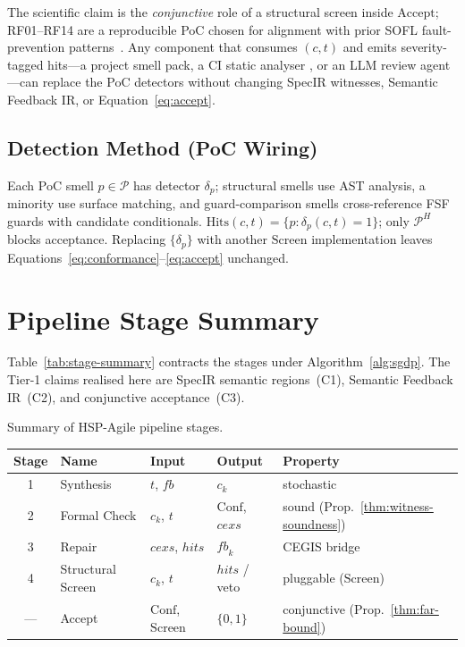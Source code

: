 The scientific claim is the \emph{conjunctive} role of a structural screen
inside $\mathrm{Accept}$; RF01--RF14 are a reproducible PoC chosen for
alignment with prior SOFL fault-prevention patterns~\citep{li2023iet_faultprevention}.
Any component that consumes $(c,t)$ and emits severity-tagged hits---a project
smell pack, a CI static analyser
\cite{hovemeyer2004findbugs,ayewah2007findbugs}, or an LLM review
agent---can replace the PoC detectors without changing SpecIR witnesses,
Semantic Feedback IR, or Equation~\eqref{eq:accept}.

\subsection{Detection Method (PoC Wiring)}
\label{subsec:method:detection}

Each PoC smell $p \in \mathcal{P}$ has detector $\delta_p$; structural smells
use AST analysis, a minority use surface matching, and guard-comparison
smells cross-reference FSF guards with candidate conditionals.
$\mathrm{Hits}(c,t) = \{p : \delta_p(c,t)=1\}$; only $\mathcal{P}^H$ blocks
acceptance.
Replacing $\{\delta_p\}$ with another $\mathrm{Screen}$ implementation leaves
Equations~\eqref{eq:conformance}--\eqref{eq:accept} unchanged.

\section{Pipeline Stage Summary}
\label{sec:method:summary}

Table~\ref{tab:stage-summary} contracts the stages under Algorithm~\ref{alg:sgdp}.
The Tier-1 claims realised here are SpecIR semantic regions~(C1), Semantic
Feedback IR~(C2), and conjunctive acceptance~(C3).

\begin{inlinetable}{Summary of HSP-Agile pipeline stages.}
  \label{tab:stage-summary}
  \footnotesize
  \setlength{\tabcolsep}{3pt}
  \begin{tabularx}{\linewidth}{@{}clXXl@{}}
    \toprule
    Stage & Name          & Input               & Output                     & Property \\
    \midrule
    1     & Synthesis     & $t$, $\mathit{fb}$  & $c_k$                      & stochastic \\
    2     & Formal Check  & $c_k$, $t$          & $\mathrm{Conf}$, $\mathit{cexs}$ & sound (Prop.~\ref{thm:witness-soundness}) \\
    3     & Repair        & $\mathit{cexs}$, $\mathit{hits}$ & $\mathit{fb}_k$ & CEGIS bridge \\
    4     & Structural Screen & $c_k$, $t$          & $\mathit{hits}$ / veto     & pluggable ($\mathrm{Screen}$) \\
    ---   & Accept        & $\mathrm{Conf}$, $\mathrm{Screen}$ & $\{0,1\}$     & conjunctive (Prop.~\ref{thm:far-bound}) \\
    \bottomrule
  \end{tabularx}
\end{inlinetable}

